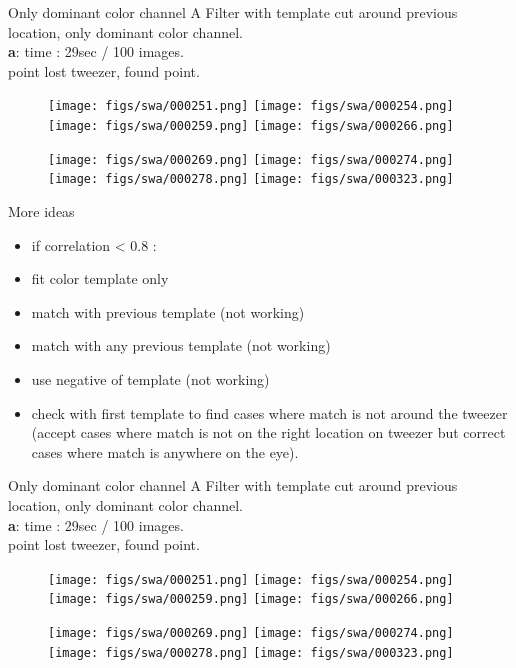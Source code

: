 \documentclass{beamer}              %
\begin{document}
\begin{frame}{Only dominant color channel A}
Filter with template cut around previous location, only dominant color channel. \\
\textbf{a}: time : 29sec / 100 images.\\
point lost tweezer, found point.
\begin{figure}
    \centering
    \texttt{[image: figs/swa/000251.png]}
    \texttt{[image: figs/swa/000254.png]}
    \texttt{[image: figs/swa/000259.png]}
    \texttt{[image: figs/swa/000266.png]}
    
    \texttt{[image: figs/swa/000269.png]}
    \texttt{[image: figs/swa/000274.png]}
    \texttt{[image: figs/swa/000278.png]}
    \texttt{[image: figs/swa/000323.png]}
\end{figure}
\end{frame}


\begin{frame}{More ideas}
\begin{itemize}
\item if correlation < 0.8 : 
\item fit color template only
\item match with previous template (not working)
\item match with any previous template (not working)
\item use negative of template (not working)
\item check with first template to find cases where match is not around the tweezer (accept cases where match is not on the right location on tweezer but correct cases where match is anywhere on the eye).
\end{itemize}
\end{frame}

\begin{frame}{Only dominant color channel A}
Filter with template cut around previous location, only dominant color channel. \\
\textbf{a}: time : 29sec / 100 images.\\
point lost tweezer, found point.
\begin{figure}
    \centering
    \texttt{[image: figs/swa/000251.png]}
    \texttt{[image: figs/swa/000254.png]}
    \texttt{[image: figs/swa/000259.png]}
    \texttt{[image: figs/swa/000266.png]}
    
    \texttt{[image: figs/swa/000269.png]}
    \texttt{[image: figs/swa/000274.png]}
    \texttt{[image: figs/swa/000278.png]}
    \texttt{[image: figs/swa/000323.png]}
\end{figure}
\end{frame}
\end{document}
